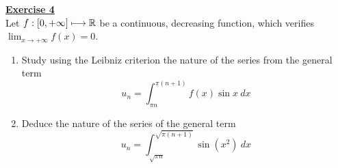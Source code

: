 \noindent\Large{\underline{\textbf{Exercise 4}}}
\normalsize{}\\
\noindent Let $f : [0, +\infty] \longmapsto \mathbb{R}$ be a continuous, decreasing function, which verifies 
$\displaystyle\lim_{x\longrightarrow +\infty} f(x) = 0.$
\begin{enumerate}
    \item Study using the Leibniz criterion the nature of the series from the general term
            $$ u_n = \int_{\pi n}^{\pi(n + 1)} f(x)\sin x\ dx$$
    \item Deduce the nature of the series of the general term
            $$ u_n = \int_{\sqrt{\pi n}}^{\sqrt{\pi(n + 1)}}\sin (x^2)\ dx$$
\end{enumerate}
